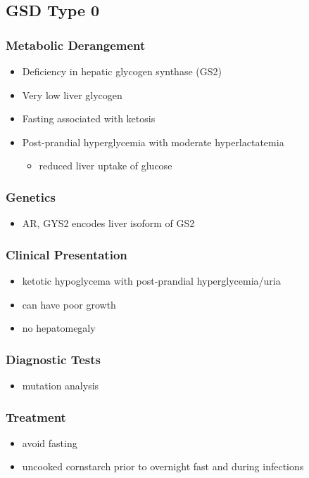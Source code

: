 \documentclass{scrartcl}
\begin{document}
\subsection{GSD Type 0}
\label{sec:org57f465a}
\subsubsection{Metabolic Derangement}
\label{sec:org4170986}
\begin{itemize}
\item Deficiency in hepatic glycogen synthase (GS2)
\item Very low liver glycogen
\item Fasting associated with ketosis
\item Post-prandial hyperglycemia with moderate hyperlactatemia
\begin{itemize}
\item reduced liver uptake of glucose
\end{itemize}
\end{itemize}

\subsubsection{Genetics}
\label{sec:org1e480e0}
\begin{itemize}
\item AR, GYS2 encodes liver isoform of GS2
\end{itemize}

\subsubsection{Clinical Presentation}
\label{sec:org264cedb}
\begin{itemize}
\item ketotic hypoglycema with post-prandial hyperglycemia/uria
\item can have poor growth
\item no hepatomegaly
\end{itemize}

\subsubsection{Diagnostic Tests}
\label{sec:org29ba3df}
\begin{itemize}
\item mutation analysis
\end{itemize}
\subsubsection{Treatment}
\label{sec:org426142b}
\begin{itemize}
\item avoid fasting
\item uncooked cornstarch prior to overnight fast and during infections
\end{itemize}
\end{document}
